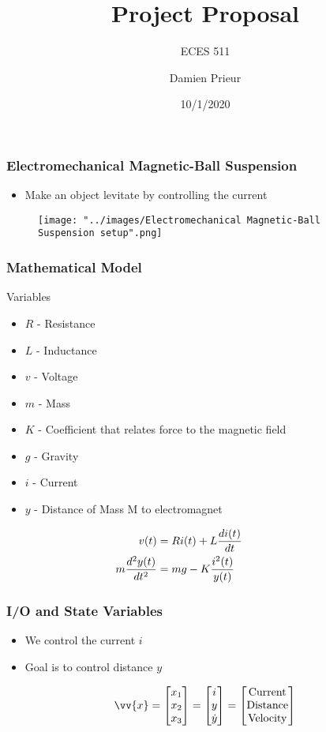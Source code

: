 \documentclass{beamer}
\title{Project Proposal}
\subtitle{ECES 511}
\author{Damien Prieur}
\date{10/1/2020}
\begin{document}
\frame{\titlepage}

\begin{frame}
\frametitle{Electromechanical Magnetic-Ball Suspension}
\begin{itemize}[$\bullet$]
\item Make an object levitate by controlling the current
\end{itemize}
\begin{figure}
\texttt{[image: "../images/Electromechanical Magnetic-Ball Suspension setup".png]}
\end{figure}
\end{frame}

\begin{frame}
\frametitle{Mathematical Model}
Variables
\begin{itemize}
\item $R$ - Resistance
\item $L$ - Inductance
\item $v$ - Voltage
\item $m$ - Mass
\item $K$ - Coefficient that relates force to the magnetic field
\item $g$ - Gravity
\item $i$ - Current
\item $y$ - Distance of Mass M to electromagnet
\end{itemize}
$$
\begin{aligned}
    &\begin{aligned}
        \mathllap{v(t)} &= Ri(t) + L\frac{di(t)}{dt}
    \end{aligned} \\
    &\begin{aligned}
        \mathllap{m\frac{d^2y(t)}{dt^2}} &= mg - K\frac{i^2(t)}{y(t)}
    \end{aligned} \\
\end{aligned}
$$
\end{frame}

\begin{frame}
\frametitle{I/O and State Variables}
\begin{itemize}[$\bullet$]
\item We control the current $i$
\item Goal is to control distance $y$
\end{itemize}
$$
\vv{x}=
\begin{bmatrix}
x_1 \\
x_2 \\
x_3
\end{bmatrix}
=
\begin{bmatrix}
i \\
y \\
\dot{y}
\end{bmatrix}
=
\begin{bmatrix}
\text{Current} \\
\text{Distance}\\
\text{Velocity}
\end{bmatrix}
$$

\end{frame}
\end{document}

